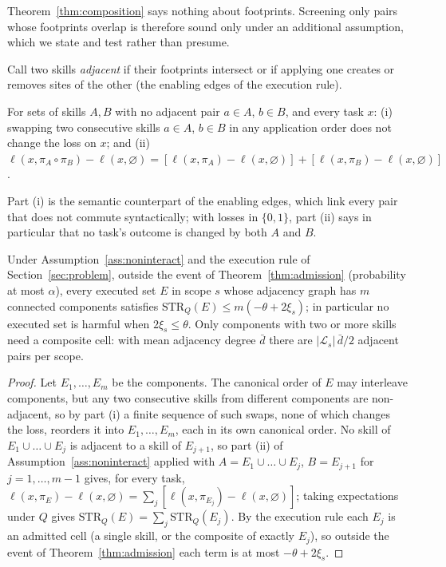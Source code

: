 Theorem~\ref{thm:composition} says nothing about footprints.  Screening only pairs whose footprints overlap is therefore sound
only under an additional assumption, which we state and test rather than presume.

Call two skills \emph{adjacent} if their footprints intersect or if applying one creates or removes sites of the other (the
enabling edges of the execution rule).

\begin{assumption}\label{ass:noninteract}
For sets of skills $A,B$ with no adjacent pair $a\in A$, $b\in B$, and every task $x$: (i) swapping two consecutive skills
$a\in A$, $b\in B$ in any application order does not change the loss on $x$; and (ii)
$\ell(x,\pi_A\circ\pi_B)-\ell(x,\varnothing)=[\ell(x,\pi_A)-\ell(x,\varnothing)]+[\ell(x,\pi_B)-\ell(x,\varnothing)]$.
\end{assumption}

Part (i) is the semantic counterpart of the enabling edges, which link every pair that does not commute syntactically; with
losses in $\{0,1\}$, part (ii) says in particular that no task's outcome is changed by both $A$ and $B$.

\begin{corollary}\label{cor:execution}
Under Assumption~\ref{ass:noninteract} and the execution rule of Section~\ref{sec:problem}, outside the event of
Theorem~\ref{thm:admission} (probability at most $\alpha$), every executed set $E$ in scope $s$ whose adjacency graph has $m$
connected components satisfies $\mathrm{STR}_Q(E)\le m(-\theta+2\xi_s)$; in particular no executed set is harmful when
$2\xi_s\le\theta$.  Only components with two or more skills need a composite cell: with mean adjacency degree $\bar d$ there are
$|\mathcal{L}_s|\,\bar d/2$ adjacent pairs per scope.
\end{corollary}

\begin{proof}
Let $E_1,\dots,E_m$ be the components.  The canonical order of $E$ may interleave components, but any two consecutive skills
from different components are non-adjacent, so by part (i) a finite sequence of such swaps, none of which changes the loss,
reorders it into $E_1,\dots,E_m$, each in its own canonical order.  No skill of $E_1\cup\dots\cup E_{j}$ is adjacent to a skill of
$E_{j+1}$, so part (ii) of Assumption~\ref{ass:noninteract} applied with $A=E_1\cup\dots\cup E_j$, $B=E_{j+1}$ for $j=1,\dots,m-1$ gives, for every task,
$\ell(x,\pi_E)-\ell(x,\varnothing)=\sum_{j}[\ell(x,\pi_{E_j})-\ell(x,\varnothing)]$; taking expectations under $Q$ gives
$\mathrm{STR}_Q(E)=\sum_j\mathrm{STR}_Q(E_j)$.  By the execution rule each $E_j$ is an admitted cell (a single skill, or the
composite of exactly $E_j$), so outside the event of Theorem~\ref{thm:admission} each term is at most $-\theta+2\xi_s$.
\end{proof}

